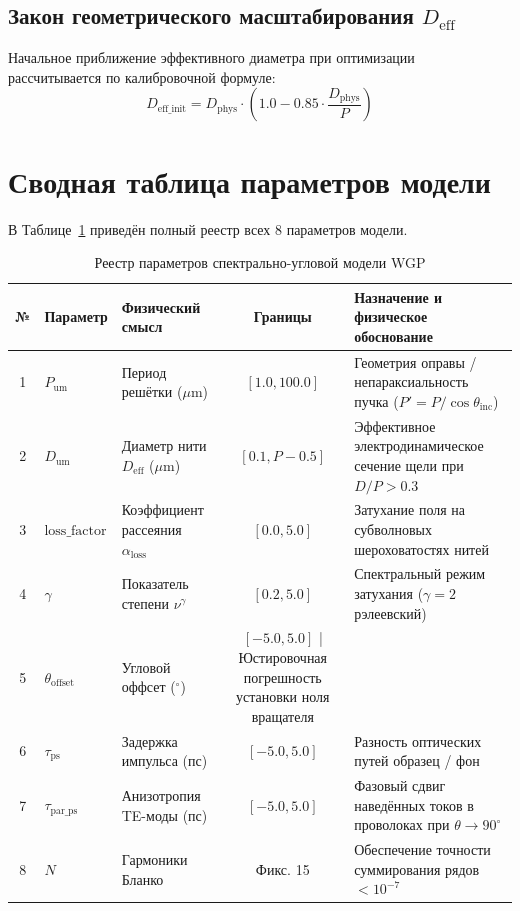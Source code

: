 \documentclass[12pt,a4paper]{article}
\begin{document}
\subsection{Закон геометрического масштабирования $D_{\text{eff}}$}
Начальное приближение эффективного диаметра при оптимизации рассчитывается по калибровочной формуле:
\begin{equation}
D_{\text{eff\_init}} = D_{\text{phys}} \cdot \left(1.0 - 0.85 \cdot \frac{D_{\text{phys}}}{P}\right)
\end{equation}

\section{Сводная таблица параметров модели}

В Таблице~\ref{tab:params} приведён полный реестр всех 8 параметров модели.

\begin{table}[H]
\centering
\caption{Реестр параметров спектрально-угловой модели WGP}
\label{tab:params}
\small
\begin{tabular}{@{}c l l c p{6.5cm}@{}}
\toprule
№ & Параметр & Физический смысл & Границы & Назначение и физическое обоснование \\
\midrule
1 & $P_{\text{um}}$ & Период решётки ($\mu\text{m}$) & $[1.0, 100.0]$ & Геометрия оправы / непараксиальность пучка ($P' = P/\cos\theta_{\text{inc}}$) \\
2 & $D_{\text{um}}$ & Диаметр нити $D_{\text{eff}}$ ($\mu\text{m}$) & $[0.1, P-0.5]$ & Эффективное электродинамическое сечение щели при $D/P > 0.3$ \\
3 & $\text{loss\_factor}$ & Коэффициент рассеяния $\alpha_{\text{loss}}$ & $[0.0, 5.0]$ & Затухание поля на субволновых шероховатостях нитей \\
4 & $\gamma$ & Показатель степени $\nu^\gamma$ & $[0.2, 5.0]$ & Спектральный режим затухания ($\gamma=2$ рэлеевский) \\
5 & $\theta_{\text{offset}}$ & Угловой оффсет ($^\circ$) & $[-5.0, 5.0]$ | Юстировочная погрешность установки ноля вращателя \\
6 & $\tau_{\text{ps}}$ & Задержка импульса (пс) & $[-5.0, 5.0]$ & Разность оптических путей образец / фон \\
7 & $\tau_{\text{par\_ps}}$ & Анизотропия TE-моды (пс) & $[-5.0, 5.0]$ & Фазовый сдвиг наведённых токов в проволоках при $\theta \to 90^\circ$ \\
8 & $N$ & Гармоники Бланко & Фикс. 15 & Обеспечение точности суммирования рядов $<10^{-7}$ \\
\bottomrule
\end{tabular}
\end{table}
\end{document}
